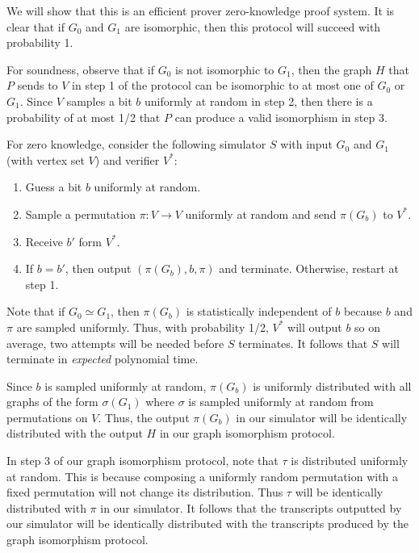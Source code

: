 We will show that this is an efficient prover zero-knowledge proof system. It is clear that if $G_0$ and $G_1$ are isomorphic, then this protocol will succeed with probability 1.

For soundness, observe that if $G_0$ is not isomorphic to $G_1$, then the graph $H$ that $P$ sends to $V$ in step 1 of the protocol can be isomorphic to at most one of $G_0$ or $G_1$. Since $V$ samples a bit $b$ uniformly at random in step 2, then there is a probability of at most 1/2 that $P$ can produce a valid isomorphism in step 3.

For zero knowledge, consider the following simulator $S$ with input $G_0$ and $G_1$ (with vertex set $V$) and verifier $V^*$:

\begin{enumerate}
\item Guess a bit $b$ uniformly at random.

\item Sample a permutation $\pi: V \to V$ uniformly at random and send $\pi (G_b)$ to $V^*$.

\item Receive $b'$ form $V^*$.

\item If $b=b'$, then output $(\pi (G_b), b, \pi)$ and terminate. Otherwise, restart at step 1.

\end{enumerate}

Note that if $G_0 \simeq G_1$, then $\pi(G_b)$ is statistically independent of $b$ because $b$ and $\pi$ are sampled uniformly. Thus, with probability 1/2, $V^*$ will output $b$ so on average, two attempts will be needed before $S$ terminates. It follows that $S$ will terminate in \emph{expected} polynomial time.

Since $b$ is sampled uniformly at random, $\pi (G_b)$ is uniformly distributed with all graphs of the form $\sigma (G_1)$ where $\sigma$ is sampled uniformly at random from permutations on $V$. Thus, the output $\pi(G_b)$ in our simulator will be identically distributed with the output $H$ in our graph isomorphism protocol.

In step 3 of our graph isomorphism protocol, note that $\tau$ is distributed uniformly at random. This is because composing a uniformly random permutation with a fixed permutation will not change its distribution. Thus $\tau$ will be identically distributed with $\pi$ in our simulator. It follows that the transcripts outputted by our simulator will be identically distributed with the transcripts produced by the graph isomorphism protocol.
		
